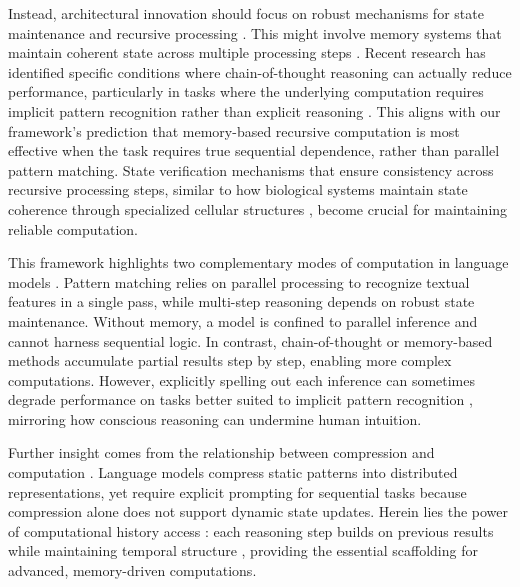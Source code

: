 \documentclass[12pt]{article}
\begin{document}
Instead, architectural innovation should focus on robust mechanisms for state maintenance and recursive processing \cite{jung2020new}.
This might involve memory systems that maintain coherent state across multiple processing steps \cite{zhu2024overcoming}.
Recent research has identified specific conditions where chain-of-thought reasoning can actually reduce performance, particularly in tasks where the underlying computation requires implicit pattern recognition rather than explicit reasoning \cite{liu2024mind}.
This aligns with our framework's prediction that memory-based recursive computation is most effective when the task requires true sequential dependence, rather than parallel pattern matching.
State verification mechanisms that ensure consistency across recursive processing steps, similar to how biological systems maintain state coherence through specialized cellular structures \cite{espinosa2024molecular}, become crucial for maintaining reliable computation.


This framework highlights two complementary modes of computation in language models \cite{wei2022chain}.
Pattern matching relies on parallel processing to recognize textual features in a single pass, while multi-step reasoning depends on robust state maintenance.
Without memory, a model is confined to parallel inference and cannot harness sequential logic.
In contrast, chain-of-thought or memory-based methods accumulate partial results step by step, enabling more complex computations.
However, explicitly spelling out each inference can sometimes degrade performance on tasks better suited to implicit pattern recognition \cite{liu2024mind}, mirroring how conscious reasoning can undermine human intuition.

Further insight comes from the relationship between compression and computation \cite{dickson2024trust}.
Language models compress static patterns into distributed representations, yet require explicit prompting for sequential tasks because compression alone does not support dynamic state updates.
Herein lies the power of computational history access \cite{fu2024memory}: each reasoning step builds on previous results while maintaining temporal structure \cite{wei2022chain}, providing the essential scaffolding for advanced, memory-driven computations.
\end{document}
